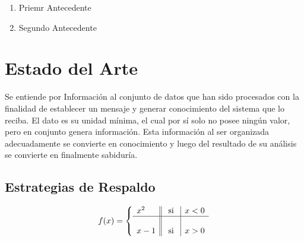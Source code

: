 \begin{enumerate}
\item Priemr Antecedente
\item Segundo Antecedente
\end{enumerate}

\section{Estado del Arte}
Se entiende por Información al conjunto de datos que han sido procesados con la finalidad de establecer un mensaje y generar conocimiento del sistema que lo reciba. El dato es su unidad mínima, el cual por sí solo no posee ningún valor, pero en conjunto genera información. Esta información al ser organizada adecuadamente se convierte en conocimiento y luego del resultado de su análisis se convierte en finalmente sabiduría. 

\subsection{Estrategias de Respaldo}

\begin{equation}
f(x)= \left\{ \begin{array}{l||c|l}
x^2 & \mbox{ si } & x<0 \\ \hline
& & \\
x-1 & \mbox{ si } & x>0
\end{array}
\right.	
\end{equation}

\begin{table}[ht]
\caption{Iteracion de Newton para $x^2-\cos(x)-1=0$ con $x_0=1.5$}
\end{table}


